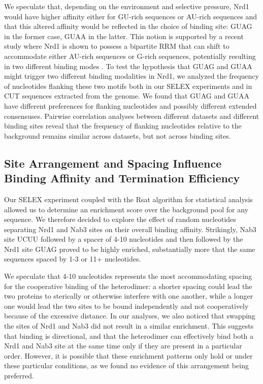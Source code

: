 We speculate that, depending on the environment and selective pressure, Nrd1 would have higher affinity either for GU-rich sequences or AU-rich sequences and that this altered affinity would be reflected in the choice of binding site: GUAG in the former case, GUAA in the latter. This notion is supported by a recent study where Nrd1 is shown to possess a bipartite RRM that can shift to accommodate either AU-rich sequences or G-rich sequences, potentially resulting in two different binding modes \cite{bacikova:2014:structure}.  To test the hypothesis that GUAG and GUAA might trigger two different binding modalities in Nrd1, we analyzed the frequency of nucleotides flanking these two motifs both in our SELEX experiments and in CUT sequences extracted from the genome. We found that GUAG and GUAA have different preferences for flanking nucleotides and possibly different extended consensuses. Pairwise correlation analyses between different datasets and different binding sites reveal that the frequency of flanking nucleotides relative to the background remains similar across datasets, but not across binding sites.

\singlespacing
\subsection{Site Arrangement and Spacing Influence Binding Affinity and Termination Efficiency}
\doublespacing

Our SELEX experiment coupled with the Rsat algorithm for statistical analysis \cite{vanhelden:1998:extracting} allowed us to determine an enrichment score over the background pool for any sequence. We therefore decided to explore the effect of random nucleotides separating Nrd1 and Nab3 sites on their overall binding affinity. Strikingly, Nab3 site UCUU followed by a spacer of 4-10 nucleotides and then followed by the Nrd1 site GUAG proved to be highly enriched, substantially more that the same sequences spaced by 1-3 or 11+ nucleotides.

We speculate that 4-10 nucleotides represents the most accommodating spacing for the cooperative binding of the heterodimer: a shorter spacing could lead the two proteins to sterically or otherwise interfere with one another, while a longer one would lead the two sites to be bound independently and not cooperatively because of the excessive distance. In our analyses, we also noticed that swapping the sites of Nrd1 and Nab3 did not result in a similar enrichment. This suggests that binding is directional, and that the heterodimer can effectively bind both a Nrd1 and Nab3 site at the same time only if they are present in a particular order. However, it is possible that these enrichment patterns only hold \invitro{} or under these particular conditions, as we found no \invivo{} evidence of this arrangement being preferred.

